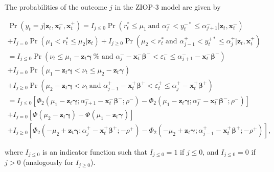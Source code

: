 \documentclass[letterpaper,fleqn,12pt]{article}
\begin{document}
\begin{onehalfspace}
\bigskip

The probabilities of the outcome $j$ in the ZIOP-3 model are given by

\begin{flushleft}
\begin{equation}
\begin{array}{l}
\Pr (y_{t}=j|\mathbf{z}_{t},\mathbf{x}_{t}^{-},\mathbf{x}_{t}^{+})=I_{j\leq
0}\Pr (r_{t}^{\ast }\leq \mu _{1}\ \text{and }\alpha _{j}^{-}<y_{t}^{-\ast
}\leq \alpha _{j+1}^{-}|\mathbf{z}_{t},\mathbf{x}_{t}^{-}) \\ 
+I_{j=0}\Pr (\mu _{1}<r_{t}^{\ast }\leq \mu _{2}|\mathbf{z}_{t})+I_{j\geq
0}\Pr (\mu _{2}<r_{t}^{\ast }\ \text{and }\alpha _{j-1}^{+}<y_{t}^{+\ast
}\leq \alpha _{j}^{+}|\mathbf{z}_{t},\mathbf{x}_{t}^{+}) \\ 
=I_{j\leq 0}\Pr (\nu _{t}\leq \mu _{1}-\mathbf{z}_{t}\mathbf{\gamma }\ \text{%
and }\alpha _{j}^{-}-\mathbf{x}_{t}^{-}\mathbf{\beta }^{-}<\varepsilon
_{t}^{-}\leq \alpha _{j+1}^{-}-\mathbf{x}_{t}^{-}\mathbf{\beta }^{-}) \\ 
+I_{j=0}\Pr (\mu _{1}-\mathbf{z}_{t}\mathbf{\gamma }<\nu _{t}\leq \mu _{2}-%
\mathbf{z}_{t}\mathbf{\gamma }) \\ 
+I_{j\geq 0}\Pr (\mu _{2}-\mathbf{z}_{t}\mathbf{\gamma }<\nu _{t}\ \text{and 
}\alpha _{j-1}^{+}-\mathbf{x}_{t}^{+}\mathbf{\beta }^{+}<\varepsilon
_{t}^{+}\leq \alpha _{j}^{+}-\mathbf{x}_{t}^{+}\mathbf{\beta }^{+}) \\ 
=I_{j\leq 0}[\Phi _{2}(\mu _{1}-\mathbf{z}_{t}\mathbf{\gamma };\alpha
_{j+1}^{-}-\mathbf{x}_{t}^{-}\mathbf{\beta }^{-}\mathbf{;}\rho ^{-})-\Phi
_{2}(\mu _{1}-\mathbf{z}_{t}\mathbf{\gamma };\alpha _{j}^{-}-\mathbf{x}%
_{t}^{-}\mathbf{\beta }^{-}\mathbf{;}\rho ^{-})] \\ 
+I_{j=0}[\Phi (\mu _{2}-\mathbf{z}_{t}\mathbf{\gamma })-\Phi (\mu _{1}-%
\mathbf{z}_{t}\mathbf{\gamma })] \\ 
+I_{j\geq 0}[\Phi _{2}(-\mu _{2}+\mathbf{z}_{t}\mathbf{\gamma };\alpha
_{j}^{+}-\mathbf{x}_{t}^{+}\mathbf{\beta }^{+};\mathbf{-}\rho ^{+})-\Phi
_{2}(-\mu _{2}+\mathbf{z}_{t}\mathbf{\gamma };\alpha _{j-1}^{+}-\mathbf{x}%
_{t}^{+}\mathbf{\beta }^{+};\mathbf{-}\rho ^{+})]\text{,}%
\end{array}
\label{Prob CroNOP}
\end{equation}
\end{flushleft}

\noindent where $I_{j\leq 0}$ is an indicator function such that $I_{j\leq
0}=1$ if $j\leq 0$, and $I_{j\leq 0}=0$ if $j>0$ (analogously for $I_{j\geq
0}$).


\end{onehalfspace}
\end{document}
